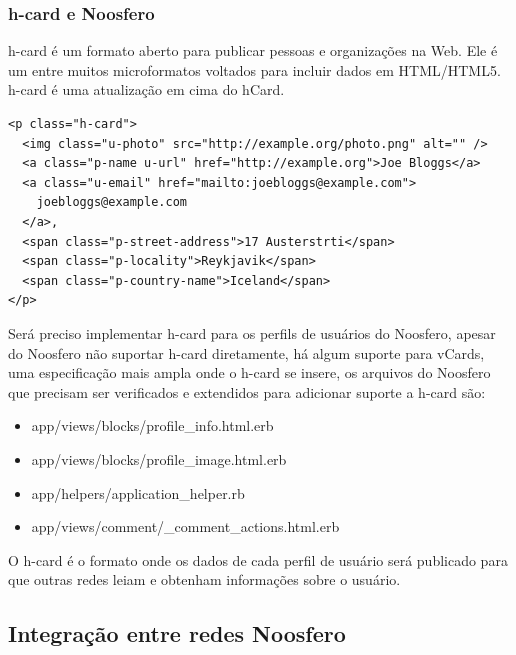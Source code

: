 \documentclass[12pt]{article}
\begin{document}
\subsubsection{h-card e Noosfero}

h-card é um formato aberto para publicar pessoas e organizações na Web. Ele é
um entre muitos microformatos voltados para incluir dados em HTML/HTML5.
h-card é uma atualização em cima do hCard.

\begin{framed}
\begin{lstlisting}[caption=Exemplo de h-card]
<p class="h-card">
  <img class="u-photo" src="http://example.org/photo.png" alt="" />
  <a class="p-name u-url" href="http://example.org">Joe Bloggs</a>
  <a class="u-email" href="mailto:joebloggs@example.com">
    joebloggs@example.com
  </a>, 
  <span class="p-street-address">17 Austerstrti</span>
  <span class="p-locality">Reykjavik</span>
  <span class="p-country-name">Iceland</span>
</p>
\end{lstlisting}
\end{framed}

Será preciso implementar h-card para os perfils de usuários do Noosfero,
apesar do Noosfero não suportar h-card diretamente, há algum suporte para
vCards, uma especificação mais ampla onde o h-card se insere, os arquivos do
Noosfero que precisam ser verificados e extendidos para adicionar suporte a
h-card são:

\begin{itemize}
  \item app/views/blocks/profile\_info.html.erb
  \item app/views/blocks/profile\_image.html.erb
  \item app/helpers/application\_helper.rb
  \item app/views/comment/\_comment\_actions.html.erb
\end{itemize}

O h-card é o formato onde os dados de cada perfil de usuário será publicado
para que outras redes leiam e obtenham informações sobre o usuário.

\subsection{Integração entre redes Noosfero}
\label{sessao-oauth}
\end{document}
